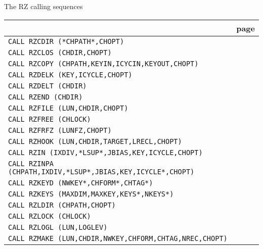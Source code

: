 {\samepage \clearpage \begin{Tabhere}%
\caption{The RZ calling sequences}
\label{TRZCALL}
\begin{center}
\begin{tabular}{|>{\tt}l@{\quad}r|}
\hline
\multicolumn{1}{|c}{\bf Calling sequence} & \multicolumn{1}{r|}{\bf page}   \\  
\hline
CALL RZCDIR (*CHPATH*,CHOPT)                             & \pageref{RZCDIR} \\  
CALL RZCLOS (CHDIR,CHOPT)                                & \pageref{RZCLOS} \\  
CALL RZCOPY (CHPATH,KEYIN,ICYCIN,KEYOUT,CHOPT)           & \pageref{RZCOPY} \\  
CALL RZDELK (KEY,ICYCLE,CHOPT)                           & \pageref{RZDELK} \\  
CALL RZDELT (CHDIR)                                      & \pageref{RZDELT} \\  
CALL RZEND (CHDIR)                                       & \pageref{RZEND}  \\  
CALL RZFILE (LUN,CHDIR,CHOPT)                            & \pageref{RZFILE} \\  
CALL RZFREE (CHLOCK)                                     & \pageref{RZFREE} \\  
CALL RZFRFZ (LUNFZ,CHOPT)                                & \pageref{RZFRFZ} \\  
CALL RZHOOK (LUN,CHDIR,TARGET,LRECL,CHOPT)               & \pageref{RZHOOK} \\  
CALL RZIN (IXDIV,*LSUP*,JBIAS,KEY,ICYCLE,CHOPT)          & \pageref{RZIN}   \\  
CALL RZINPA (CHPATH,IXDIV,*LSUP*,JBIAS,KEY,ICYCLE*,CHOPT)& \pageref{RZINPA} \\  
CALL RZKEYD (NWKEY*,CHFORM*,CHTAG*)                      & \pageref{RZKEYD} \\  
CALL RZKEYS (MAXDIM,MAXKEY,KEYS*,NKEYS*)                 & \pageref{RZKEYS} \\  
CALL RZLDIR (CHPATH,CHOPT)                               & \pageref{RZLDIR} \\  
CALL RZLOCK (CHLOCK)                                     & \pageref{RZLOCK} \\  
CALL RZLOGL (LUN,LOGLEV)                                 & \pageref{RZLOGL} \\  
CALL RZMAKE (LUN,CHDIR,NWKEY,CHFORM,CHTAG,NREC,CHOPT)    & \pageref{RZMAKE} \\  

\end{tabular}
\end{center}
\end{Tabhere}}
